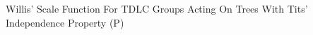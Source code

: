\documentclass[preview]{standalone}
\begin{document}
\begin{center}
Willis' Scale Function For TDLC Groups Acting On Trees With Tits' Independence Property (P)
\end{center}
\end{document}
